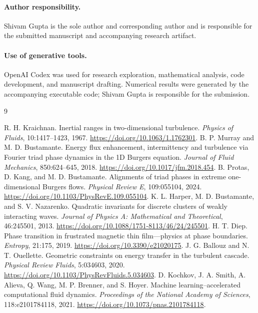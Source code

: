 \documentclass[11pt]{article}
\begin{document}
\paragraph{Author responsibility.} Shivam Gupta is the sole author and corresponding author and is responsible for the submitted manuscript and accompanying research artifact.
\paragraph{Use of generative tools.} OpenAI Codex was used for research exploration, mathematical analysis, code development, and manuscript drafting. Numerical results were generated by the accompanying executable code; Shivam Gupta is responsible for the submission.

\begin{thebibliography}{9}\raggedright
{} R. H. Kraichnan. Inertial ranges in two-dimensional turbulence. \emph{Physics of Fluids}, 10:1417--1423, 1967. \url{https://doi.org/10.1063/1.1762301}.
 B. P. Murray and M. D. Bustamante. Energy flux enhancement, intermittency and turbulence via Fourier triad phase dynamics in the 1D Burgers equation. \emph{Journal of Fluid Mechanics}, 850:624--645, 2018. \url{https://doi.org/10.1017/jfm.2018.454}.
 B. Protas, D. Kang, and M. D. Bustamante. Alignments of triad phases in extreme one-dimensional Burgers flows. \emph{Physical Review E}, 109:055104, 2024. \url{https://doi.org/10.1103/PhysRevE.109.055104}.
 K. L. Harper, M. D. Bustamante, and S. V. Nazarenko. Quadratic invariants for discrete clusters of weakly interacting waves. \emph{Journal of Physics A: Mathematical and Theoretical}, 46:245501, 2013. \url{https://doi.org/10.1088/1751-8113/46/24/245501}.
 H. T. Diep. Phase transition in frustrated magnetic thin film---physics at phase boundaries. \emph{Entropy}, 21:175, 2019. \url{https://doi.org/10.3390/e21020175}.
 J. G. Ballouz and N. T. Ouellette. Geometric constraints on energy transfer in the turbulent cascade. \emph{Physical Review Fluids}, 5:034603, 2020. \url{https://doi.org/10.1103/PhysRevFluids.5.034603}.
 D. Kochkov, J. A. Smith, A. Alieva, Q. Wang, M. P. Brenner, and S. Hoyer. Machine learning--accelerated computational fluid dynamics. \emph{Proceedings of the National Academy of Sciences}, 118:e2101784118, 2021. \url{https://doi.org/10.1073/pnas.2101784118}.
\end{thebibliography}

\appendix
\end{document}
